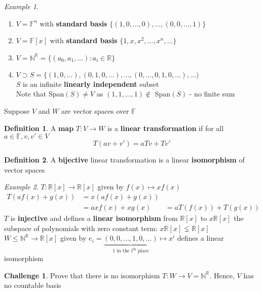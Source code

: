 \documentclass[11pt, a4paper]{report}
\numberwithin{equation}{section}
\newcommand{\R}{\mathbb{R}}
\newcommand{\N}{\mathbb{N}}
\newcommand{\F}{\mathbb{F}}
\newcommand{\nin}{\not\in}
\numberwithin{equation}{subsection}
\theoremstyle{plain}
\theoremstyle{definition}
\newtheorem{defn}{Definition}[chapter]
\newtheorem{ch}{Challenge}
\theoremstyle{remark}
\newtheorem{exmp}{Example}[chapter]
\begin{document}
\begin{exmp}${}$
\begin{enumerate}
\item[] $V = \F^n$ with \textbf{standard basis} $\{(1, 0, \ldots, 0), \ldots, (0, 0, \ldots, 1)\}$
\item[] $V = \F[x]$ with \textbf{standard basis} $\{1, x, x^2, \ldots, x^n, \ldots\}$
\item[] $V = \N^\R = \{(a_0, a_1, \ldots) : a_i \in \R\}$
\item[] $V \supset S = \{(1, 0, \ldots), (0, 1, 0, \ldots), \ldots, (0, \ldots, 0, 1, 0, \ldots), \ldots)$\\ \hspace*{1cm} $S$ is an infinite \textbf{linearly independent} subset\\ \hspace*{1cm} Note that Span$(S) \neq V$ as $(1, 1, \ldots, 1) \nin$ Span$(S)$ - no finite sum
\end{enumerate}
\end{exmp}

Suppose $V$ and $W$ are vector spaces over $\F$
\begin{defn} A \textbf{map} $T: V \to W$ is a \textbf{linear transformation} if for all $a \in \F, v, v' \in V$ $$T(av + v') = a Tv + Tv'$$ \end{defn}

\begin{defn} A \textbf{bijective} linear transformation is a linear \textbf{isomorphism} of vector spaces \end{defn}

\begin{exmp}
$T: \R[x] \to \R[x]$ given by $f(x) \mapsto x f(x)$\\
\begin{align*}
T(af(x) + g(x)) 	&= x(af(x) + g(x))\\
					&= axf(x) + xg(x)
					&= aT(f(x)) + T(g(x))
\end{align*}
$T$ is \textbf{injective} and defines a \textbf{linear isomorphism} from $\R[x]$ to $x \R[x]$ the subspace of polynomials with zero constant term: $x \R[x] \lneq \R[x]$\\
$W \leq \N^\R \to \R[x]$ given by $e_i = \underbrace{(0, 0, \ldots, 1, 0, \ldots)}_{1 \text{ in the i$^{\text{th}}$ place}} \mapsto x^i$ defines a linear isomorphism
\end{exmp}

\begin{ch} Prove that there is no isomorphism $T: W \to V = \N^\R$. Hence, $V$ has no countable basis \end{ch}
\end{document}

